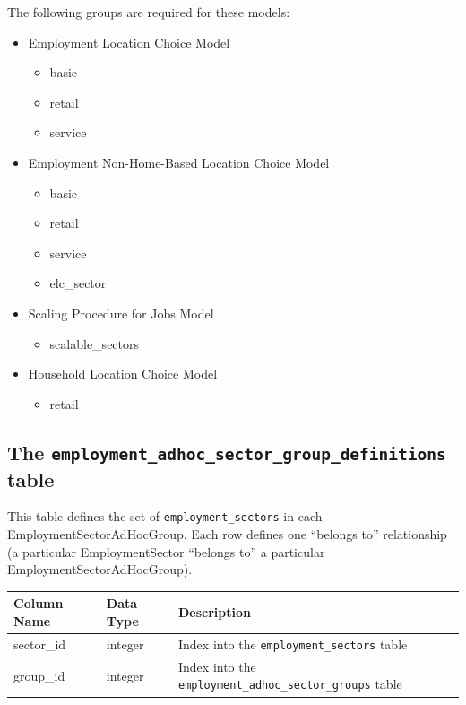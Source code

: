 The following groups are required for these models:
\begin{itemize} \tight
\item Employment Location Choice Model 
\begin{itemize} \tight
\item basic
\item retail
\item service

\end{itemize}
\item Employment Non-Home-Based Location Choice Model 
\begin{itemize} \tight
\item basic
\item retail
\item service
\item elc_sector

\end{itemize}
\item Scaling Procedure for Jobs Model 
\begin{itemize} \tight
\item scalable_sectors

\end{itemize}
\item Household Location Choice Model 
\begin{itemize} \tight
\item retail

\end{itemize}

\end{itemize}

\subsection{The {\tt employment_adhoc_sector_group_definitions} table}

This table defines the set of \verb|employment_sectors| in each
EmploymentSectorAdHocGroup. Each row defines one ``belongs to'' relationship (a
particular EmploymentSector ``belongs to'' a particular
EmploymentSectorAdHocGroup).

\begin{tabular}{|l|l|l|}
\hline
\textbf{Column Name} & \textbf{Data Type} & \textbf{Description} \\
\hline
sector_id & integer & Index into the \verb|employment_sectors| table  \\
\hline
group_id & integer & Index into the \verb|employment_adhoc_sector_groups| table  \\
\hline
\end{tabular}

